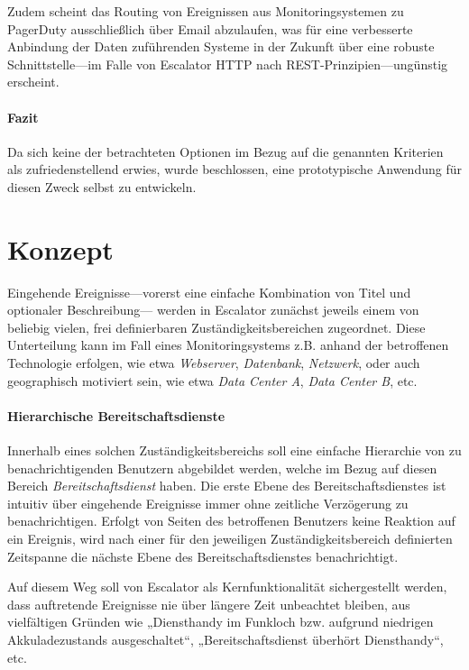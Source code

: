 \documentclass[11pt,utf8,notoc,bibnum,german,final]{zihpub}
\begin{document}
Zudem scheint das Routing von Ereignissen aus Monitoringsystemen zu PagerDuty
ausschließlich über Email abzulaufen, was für eine verbesserte Anbindung der
Daten zuführenden Systeme in der Zukunft über eine robuste Schnittstelle—im
Falle von Escalator HTTP nach REST-Prinzipien—ungünstig erscheint.

\paragraph{Fazit}

Da sich keine der betrachteten Optionen im Bezug auf die genannten Kriterien
als zufriedenstellend erwies, wurde beschlossen, eine prototypische Anwendung
für diesen Zweck selbst zu entwickeln.

\section{Konzept}
\label{concept}

Eingehende Ereignisse—vorerst eine einfache Kombination von Titel und
optionaler Beschreibung— werden in Escalator zunächst jeweils einem von
beliebig vielen, frei definierbaren Zuständigkeitsbereichen zugeordnet. Diese
Unterteilung kann im Fall eines Monitoringsystems z.B. anhand der betroffenen
Technologie erfolgen, wie etwa \emph{Webserver}, \emph{Datenbank},
\emph{Netzwerk}, oder auch geographisch motiviert sein, wie etwa \emph{Data
Center A}, \emph{Data Center B}, etc.

\paragraph{Hierarchische Bereitschaftsdienste}

Innerhalb eines solchen Zuständigkeitsbereichs soll eine einfache Hierarchie
von zu benachrichtigenden Benutzern abgebildet werden, welche im Bezug auf
diesen Bereich \emph{Bereitschaftsdienst} haben. Die erste Ebene des
Bereitschaftsdienstes ist intuitiv über eingehende Ereignisse immer ohne
zeitliche Verzögerung zu benachrichtigen. Erfolgt von Seiten des betroffenen
Benutzers keine Reaktion auf ein Ereignis, wird nach einer für den jeweiligen
Zuständigkeitsbereich definierten Zeitspanne die nächste Ebene des
Bereitschaftsdienstes benachrichtigt.

Auf diesem Weg soll von Escalator als Kernfunktionalität sichergestellt werden,
dass auftretende Ereignisse nie über längere Zeit unbeachtet bleiben, aus
vielfältigen Gründen wie „Diensthandy im Funkloch bzw. aufgrund niedrigen
Akkuladezustands ausgeschaltet“, „Bereitschaftsdienst überhört Diensthandy“,
etc.
\end{document}
